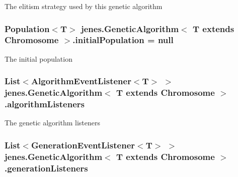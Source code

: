 The elitism strategy used by this genetic algorithm \hypertarget{classjenes_1_1_genetic_algorithm_3_01_t_01extends_01_chromosome_01_4_b6535da7a5097e18e6305d0f26f7cf5f}{
\subsubsection[initialPopulation]{\setlength{\rightskip}{0pt plus 5cm}Population$<$T$>$ jenes.GeneticAlgorithm$<$ T extends Chromosome $>$.{\bf initialPopulation} = null}}
\label{classjenes_1_1_genetic_algorithm_3_01_t_01extends_01_chromosome_01_4_b6535da7a5097e18e6305d0f26f7cf5f}


The initial population \hypertarget{classjenes_1_1_genetic_algorithm_3_01_t_01extends_01_chromosome_01_4_53540867ddd13889614232b3cbea6d6f}{
\subsubsection[algorithmListeners]{\setlength{\rightskip}{0pt plus 5cm}List$<$AlgorithmEventListener$<$T$>$ $>$ jenes.GeneticAlgorithm$<$ T extends Chromosome $>$.{\bf algorithmListeners}}}
\label{classjenes_1_1_genetic_algorithm_3_01_t_01extends_01_chromosome_01_4_53540867ddd13889614232b3cbea6d6f}


The genetic algorithm listeners \hypertarget{classjenes_1_1_genetic_algorithm_3_01_t_01extends_01_chromosome_01_4_265c4e10d321e68ae5757abf68d88739}{
\subsubsection[generationListeners]{\setlength{\rightskip}{0pt plus 5cm}List$<$GenerationEventListener$<$T$>$ $>$ jenes.GeneticAlgorithm$<$ T extends Chromosome $>$.{\bf generationListeners}}}
\label{classjenes_1_1_genetic_algorithm_3_01_t_01extends_01_chromosome_01_4_265c4e10d321e68ae5757abf68d88739}


